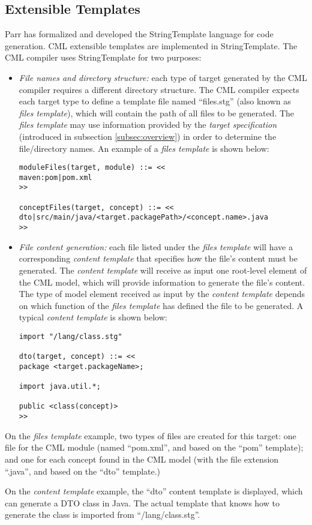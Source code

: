 \subsection{Extensible Templates}\label{subsec:templates}

Parr has formalized and developed the StringTemplate \cite{st} language for code generation. CML extensible templates are implemented in StringTemplate. The CML compiler uses StringTemplate for two purposes:

\begin{itemize}

\item \emph{File names and directory structure:}
each type of target generated by the CML compiler requires a different directory structure.
The CML compiler expects each target type to define a template file named ``files.stg'' (also known as \emph{files template}),
which will contain the path of all files to be generated.
The \emph{files template} may use information provided by the \emph{target specification} (introduced in subsection \ref{subsec:overview})
in order to determine the file/directory names.
An example of a \emph{files template} is shown below:
\verbatimfont{\scriptsize}
\begin{verbatim}
moduleFiles(target, module) ::= <<
maven:pom|pom.xml
>>

conceptFiles(target, concept) ::= <<
dto|src/main/java/<target.packagePath>/<concept.name>.java
>>
\end{verbatim}

\item \emph{File content generation:}
each file listed under the \emph{files template} will have a corresponding \emph{content template} that specifies how the file's content must be generated. The \emph{content template} will receive as input one root-level element of the CML model, which will provide information to generate the file's content. The type of model element received as input by the \emph{content template} depends on which function of the \emph{files template} has defined the file to be generated.
A typical \emph{content template} is shown below:
\verbatimfont{\scriptsize}
\begin{verbatim}
import "/lang/class.stg"

dto(target, concept) ::= <<
package <target.packageName>;

import java.util.*;

public <class(concept)>
>>
\end{verbatim}


\end{itemize}

On the \emph{files template} example,
two types of files are created for this target:
one file for the CML module (named ``pom.xml'', and based on the ``pom'' template); and one for each concept found in the CML model (with the file extension ``.java'', and based on the ``dto'' template.)

On the \emph{content template} example, the ``dto'' content template is displayed, which can generate a DTO class in Java. The actual template that knows how to generate the class is imported from ``/lang/class.stg''.
